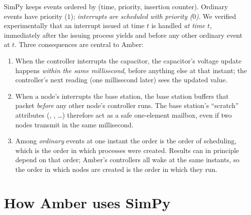 SimPy keeps events ordered by (time, priority, insertion counter). Ordinary events have priority  ($1$); \emph{interrupts are scheduled with priority
 ($0$)}. We verified experimentally that an interrupt issued at time $t$ is handled \emph{at time $t$}, immediately after the issuing process yields and
before any other ordinary event at $t$. Three consequences are central to Amber:
\begin{enumerate}
 \item When the controller interrupts the capacitor, the capacitor's voltage update happens \emph{within the same millisecond}, before anything else at that instant; the controller's next
   reading (one millisecond later) sees the updated value.
 \item When a node's  interrupts the base station, the base station buffers that packet \emph{before} any other node's controller runs. The base station's ``scratch'' attributes
   (, , \dots) therefore act as a safe one-element mailbox, even if two nodes transmit in the same millisecond.
 \item Among \emph{ordinary} events at one instant the order is the order of scheduling, which is the order in which processes were created. Results can in principle depend on that order; Amber's controllers all wake at the same instants, so the order in which nodes are created is the order in which they run.
\end{enumerate}

\section{How Amber uses SimPy}
\label{sec:amberusessimpy}

